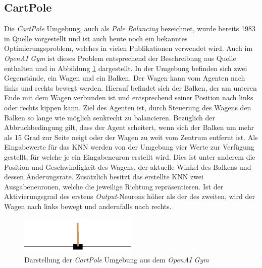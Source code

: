 \subsection{CartPole}
Die \emph{CartPole} Umgebung, auch als \emph{Pole Balancing} bezeichnet, wurde bereits 1983 in Quelle \cite{barto1983neuronlike} vorgestellt und ist auch heute noch ein bekanntes Optimierungsproblem, welches in vielen Publikationen verwendet wird. Auch im \emph{OpenAI Gym} ist dieses Problem entsprechend der Beschreibung aus Quelle \cite{barto1983neuronlike} enthalten und in Abbildung \ref{fig:cartpole_environment} dargestellt. In der Umgebung befinden sich zwei Gegenstände, ein Wagen und ein Balken. Der Wagen kann vom Agenten nach links und rechts bewegt werden. Hierauf befindet sich der Balken, der am unteren Ende mit dem Wagen verbunden ist und entsprechend seiner Position nach links oder rechts kippen kann. Ziel des Agenten ist, durch Steuerung des Wagens den Balken so lange wie möglich senkrecht zu balancieren. Bezüglich der Abbruchbedingung gilt, dass der Agent scheitert, wenn  sich der Balken um mehr als 15 Grad zur Seite neigt oder der Wagen zu weit vom Zentrum entfernt ist. Als Eingabewerte für das \ac{KNN} werden von der Umgebung vier Werte zur Verfügung gestellt, für welche je ein Eingabeneuron erstellt wird. Dies ist unter anderem die Position und Geschwindigkeit des Wagens, der aktuelle Winkel des Balkens und dessen Änderungsrate. Zusätzlich besitzt das erstellte \ac{KNN} zwei Ausgabeneuronen, welche die jeweilige Richtung repräsentieren. Ist der Aktivierungsgrad des erstens \emph{Output}-Neurons höher als der des zweiten, wird der Wagen nach links bewegt und andernfalls nach rechts.
\begin{figure}[!h]
	\centering
	\includegraphics[width=0.5\textwidth]{./img/cartpole_env.JPG} 
	\caption{Darstellung der \emph{CartPole} Umgebung aus dem \emph{OpenAI Gym}}
	\label{fig:cartpole_environment}
\end{figure} 
